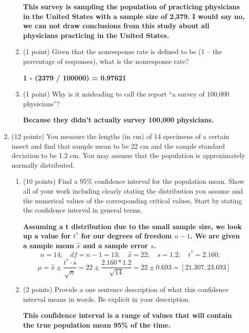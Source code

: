 \documentclass{article}
\begin{document}
\begin{enumerate}
\begin{enumerate}
	\textbf{This survey is sampling the population of practicing physicians in the United States with a sample size of 2,379. I would say no, we can not draw conclusions from this study about all physicians practicing in the United States.} \\
	
	\item (1 point) Given that the nonresponse rate is defined to be (1 – the percentage of responses), what is the nonresponse rate?
	
	\textbf{1 - (2379 / 100000) = 0.97621} \\
	
	\item (1 point) Why is it misleading to call the report “a survey of 100,000 physicians”?
	
	\textbf{Because they didn't actually survey 100,000 physicians.} \\
	
	\end{enumerate}

\item (12 points) You measure the lengths (in cm) of 14 specimens of a certain insect and find that sample mean to be 22 cm and the sample standard deviation to be 1.2 cm. You may assume that the population is approximately normally distributed.

	\begin{enumerate}
	\item (10 points) Find a 95\% confidence interval for the population mean. Show all of your work including clearly stating the distribution you assume and the numerical values of the corresponding critical values. Start by stating the confidence interval in general terms.
	
	\textbf{Assuming a t distribution due to the small sample size, we look up a value for $t^*$ for our degrees of freedom $n-1$. We are given a sample mean $\hat{x}$ and a sample error $s$. }
	\[
	n = 14; \quad df = n - 1 = 13; \quad \hat{x} = 22; \quad s = 1.2; \quad t^* = 2.160; \quad 
	\]
	\[
	\mu = \hat{x} \pm \frac{t^* \cdot s}{\sqrt{n}} = 22 \pm \frac{2.160 * 1.2}{\sqrt{14}} = 22 \pm 0.693 = \left[21.307 , 23.693 \right]
	\]
	


	
	\item (2 points) Provide a one sentence description of what this confidence interval means in words. Be explicit in your description.
	
	\textbf{This confidence interval is a range of values that will contain the true population mean 95\% of the time.}
	\end{enumerate}
\end{enumerate}
\end{document}
